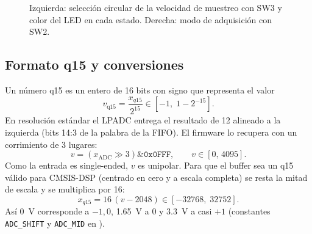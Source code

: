 \documentclass[11pt,a4paper]{article}
\begin{document}
\begin{figure}[H]
\centering
{}
\caption{Izquierda: selección circular de la velocidad de muestreo con SW3 y
color del LED en cada estado. Derecha: modo de adquisición con SW2.}
\label{fig:estados}
\end{figure}

\subsection{Formato q15 y conversiones}

Un número q15 es un entero de 16 bits con signo que representa el valor
\begin{equation}
  v_{\mathrm{q15}} = \frac{x_{q15}}{2^{15}} \in \left[-1,\; 1-2^{-15}\right].
\end{equation}
En resolución estándar el LPADC entrega el resultado de \qty{12}{\bit}
alineado a la izquierda (bits 14:3 de la palabra de la FIFO). El firmware lo
recupera con un corrimiento de 3 lugares:
\begin{equation}
  v = \left(x_{\text{ADC}} \gg 3\right) \mathbin{\&} \texttt{0x0FFF},
  \qquad v \in [0,\,4095].
\end{equation}
Como la entrada es single-ended, $v$ es unipolar. Para que el buffer sea un
q15 válido para CMSIS-DSP (centrado en cero y a escala completa) se resta la
mitad de escala y se multiplica por 16:
\begin{equation}
  x_{q15} = 16\,(v - 2048) \in [-32768,\; 32752].
\end{equation}
Así \qty{0}{\volt} corresponde a $-1{,}0$, \qty{1.65}{\volt} a $0$ y
\qty{3.3}{\volt} a casi $+1$ (constantes \texttt{ADC\_SHIFT} y
\texttt{ADC\_MID} en ).
\end{document}
